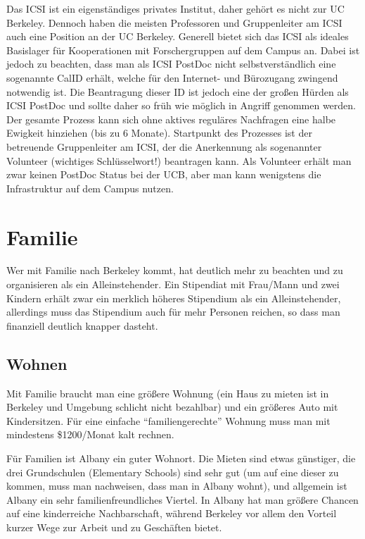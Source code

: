 \documentclass[a4paper]{scrreprt}
\begin{document}
Das ICSI ist ein eigenständiges privates Institut, daher gehört es nicht zur UC Berkeley. 
Dennoch haben die meisten Professoren und Gruppenleiter am ICSI auch eine Position an der UC Berkeley. 
Generell bietet sich das ICSI als ideales Basislager für Kooperationen mit Forschergruppen auf dem Campus an. 
Dabei ist jedoch zu beachten, dass man als ICSI PostDoc nicht selbstverständlich eine sogenannte CalID erhält, 
welche für den Internet- und Bürozugang zwingend notwendig ist. Die Beantragung dieser ID ist jedoch eine der großen Hürden als ICSI PostDoc und sollte daher so früh wie möglich in Angriff genommen werden. Der gesamte Prozess kann sich ohne aktives reguläres Nachfragen eine halbe Ewigkeit hinziehen (bis zu 6 Monate). Startpunkt des Prozesses ist der betreuende Gruppenleiter am ICSI, der die Anerkennung als sogenannter Volunteer (wichtiges Schlüsselwort!) beantragen kann. Als Volunteer erhält man zwar keinen PostDoc Status bei der UCB, aber man kann wenigstens die Infrastruktur auf dem Campus nutzen. 


\chapter{Familie}

Wer mit Familie nach Berkeley kommt, hat deutlich mehr zu beachten und zu organisieren als ein Alleinstehender. Ein Stipendiat mit Frau/Mann und zwei Kindern erhält zwar ein merklich höheres Stipendium als ein Alleinstehender, allerdings muss das Stipendium auch für mehr Personen reichen, so dass man finanziell deutlich knapper dasteht.


\section{Wohnen}

Mit Familie braucht man eine größere Wohnung (ein Haus zu mieten ist in Berkeley und Umgebung schlicht nicht bezahlbar) und ein größeres Auto mit Kindersitzen. Für eine einfache "`familiengerechte"' Wohnung muss man mit  mindestens \$1200/Monat kalt rechnen.

Für Familien ist Albany ein guter Wohnort. Die Mieten sind etwas günstiger, die drei Grundschulen (Elementary Schools) sind sehr gut (um auf eine dieser zu kommen, muss man nachweisen, dass man in Albany wohnt), und allgemein ist Albany ein sehr familienfreundliches Viertel. In Albany hat man größere Chancen auf eine kinderreiche Nachbarschaft, während Berkeley vor allem den Vorteil kurzer Wege zur Arbeit und zu Geschäften bietet.
\end{document}

